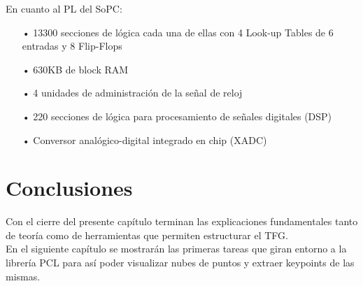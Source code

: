 En cuanto al PL del SoPC:
\begin{itemize}
\item[•] 13300 secciones de lógica cada una de ellas con 4 Look-up Tables de 6 entradas y 8 Flip-Flops
\item[•]630KB de block RAM
\item[•] 4 unidades de administración de la señal de reloj
\item[•] 220 secciones de lógica para procesamiento de señales digitales (DSP)
\item[•] Conversor analógico-digital integrado en chip (XADC)

\end{itemize}

\section{Conclusiones}
Con el cierre del presente capítulo terminan las explicaciones fundamentales tanto de teoría como de herramientas que permiten estructurar el TFG.
\\
En el siguiente capítulo se mostrarán las primeras tareas que giran entorno a la librería PCL para así poder visualizar nubes de puntos y extraer keypoints de las mismas.

